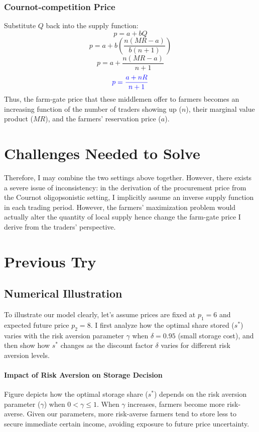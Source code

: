 \documentclass[12pt]{article}
\begin{document}
\subsubsection*{Cournot-competition Price}

Substitute \( Q \) back into the supply function:
\[
p = a + bQ
\]
\[
p = a + b \left( \frac{n(MR - a)}{b(n+1)} \right)
\]
\[
p = a + \frac{n(MR - a)}{n+1}
\]
\begin{equation}
    \textcolor{blue}{p = \frac{a + nR}{n+1}}
    \label{Eq: optimal procure price, linear supply case}
\end{equation}
Thus, the farm-gate price that these middlemen offer to farmers becomes an increasing function of the number of traders showing up ($n$), their marginal value product ($MR$), and the farmers' reservation price ($a$).


\section{Challenges Needed to Solve}
Therefore, I may combine the two settings above together. However, there exists a severe issue of inconsistency: in the derivation of the procurement price from the Cournot oligopsonistic setting, I implicitly assume an inverse supply function in each trading period. However, the farmers' maximization problem would actually alter the quantity of local supply hence change the farm-gate price I derive from the traders' perspective. 




\newpage
\appendix
\section{Previous Try}
\subsection{Numerical Illustration}
To illustrate our model clearly, let's assume prices are fixed at $p_1=6$ and expected future price $p_2=8$. I first analyze how the optimal share stored ($s^*$) varies with the risk aversion parameter $\gamma$ when $\delta=0.95$ (small storage cost), and then show how $s^*$ changes as the discount factor $\delta$ varies for different risk aversion levels.

\paragraph{Impact of Risk Aversion on Storage Decision}
Figure depicts how the optimal storage share ($s^*$) depends on the risk aversion parameter ($\gamma$) when $0<\gamma\leq1$. When $\gamma$ increases, farmers become more risk-averse. Given our parameters, more risk-averse farmers tend to store less to secure immediate certain income, avoiding exposure to future price uncertainty.
\end{document}
